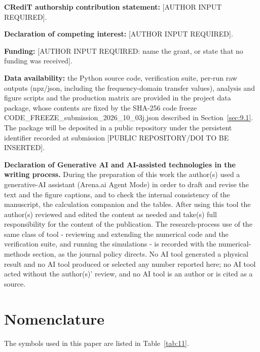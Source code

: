 \documentclass[preprint,12pt]{elsarticle}
\begin{document}
\textbf{CRediT authorship contribution statement:} [AUTHOR INPUT REQUIRED].

\textbf{Declaration of competing interest:} [AUTHOR INPUT REQUIRED].

\textbf{Funding:} [AUTHOR INPUT REQUIRED: name the grant, or state that no funding was received].

\textbf{Data availability:} the Python source code, verification suite, per-run raw outputs (npz/json, including the frequency-domain transfer values), analysis and figure scripts and the production matrix are provided in the project data package, whose contents are fixed by the SHA-256 code freeze CODE\_FREEZE\_submission\_2026\_10\_03j.json described in Section~\ref{sec:9.1}. The package will be deposited in a public repository under the persistent identifier recorded at submission [PUBLIC REPOSITORY/DOI TO BE INSERTED].

\textbf{Declaration of Generative AI and AI-assisted technologies in the writing process.} During the preparation of this work the author(s) used a generative-AI assistant (Arena.ai Agent Mode) in order to draft and revise the text and the figure captions, and to check the internal consistency of the manuscript, the calculation companion and the tables. After using this tool the author(s) reviewed and edited the content as needed and take(s) full responsibility for the content of the publication. The research-process use of the same class of tool - reviewing and extending the numerical code and the verification suite, and running the simulations - is recorded with the numerical-methods section, as the journal policy directs. No AI tool generated a physical result and no AI tool produced or selected any number reported here; no AI tool acted without the author(s)' review, and no AI tool is an author or is cited as a source.

\appendix
\section{Nomenclature}
\label{sec:appendix}

The symbols used in this paper are listed in Table~\ref{tab:11}.
\end{document}
